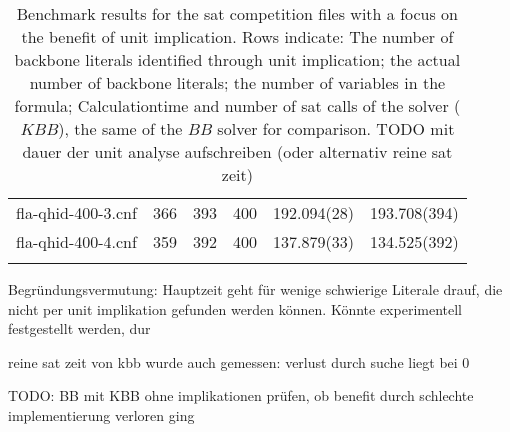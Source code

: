 \begin{table}
\begin{tabular}{l| c c c c c }
fla-qhid-400-3.cnf & 366 & 393 & 400 & 192.094(28) & 193.708(394) \\
fla-qhid-400-4.cnf & 359 & 392 & 400 & 137.879(33) & 134.525(392) \\
\fi
\hline
\end{tabular}
\caption{Benchmark results for the sat competition files with a focus on the benefit of unit implication.
Rows indicate: The number of backbone literals identified through unit implication; the actual number of backbone literals; the number of variables in the formula; Calculationtime and number of sat calls of the solver ($KBB$), the same of the $BB$ solver for comparison. TODO mit dauer der unit analyse aufschreiben (oder alternativ reine sat zeit)}
\end{table}

Begründungsvermutung: Hauptzeit geht für wenige schwierige Literale drauf, die nicht per unit implikation gefunden werden können. Könnte experimentell festgestellt werden, dur

reine sat zeit von kbb wurde auch gemessen: verlust durch suche liegt bei 0

TODO: BB mit KBB ohne implikationen prüfen, ob benefit durch schlechte implementierung verloren ging